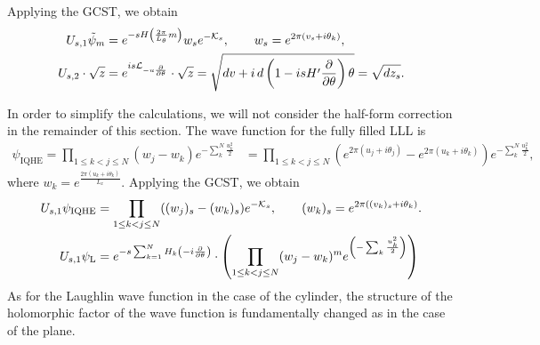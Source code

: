 \documentclass[notas.tex]{subfiles} 				%
\begin{document}
Applying the GCST, we obtain
\begin{align}\label{eq_cyl_spf_evolution}
	U_{s,1} \tilde \psi_m &= e^{-s H \left (\frac{2 \pi}{L_\theta} m \right )} w_s e^{-\mathcal{K}_s}, \qquad w_s = e^{2\pi \left (v_s + i \theta_k \right )}, \\
	U_{s,2} \cdot \sqrt{z} &= e^{i s\mathcal{L}_{-u \frac{\partial }{\partial \theta}} } \cdot \sqrt{z} = \sqrt{dv + i \, d \left( 1 - i s H' \frac{\partial }{\partial \theta} \right)\theta}= \sqrt{dz_{s}}.
\end{align}

\begin{figure}%
	\centering
	\qquad
    \label{fig:example}%
\end{figure}

\begin{figure}%
	\centering
	\qquad
    \label{fig:example}%
\end{figure}

In order to simplify the calculations, we will not consider the half-form correction in the remainder of this section. The wave function for the fully filled LLL is
\begin{align*}
	\psi_\text{IQHE} = \prod_{1 \leq k < j \leq N}(w_j-w_k) e^{-\sum_{k}^N\frac{u_k^2}{2}} &= \prod_{1 \leq k < j \leq N}\left(e^{2\pi (u_j + i \theta_j)}-e^{2\pi (u_k + i \theta_k)}\right) e^{-\sum_{k}^N\frac{u_k^2}{2}},
\end{align*}
where $w_k = e^{\frac{2\pi (u_k+i\theta_k)}{L_x}}$. Applying the GCST, we obtain
\begin{align} \label{eq_cyl_iqh_evolution}
	U_{s,1} \psi_\text{IQHE} &= \prod_{1 \leq k < j \leq N}((w_j)_s-(w_k)_s) e^{-\mathcal{K}_s}, \qquad (w_k)_s = e^{2\pi \left ((v_k)_s + i \theta_k \right )}. \\
	U_{s,1} \psi_\text{L} &= e^{- s \sum_{k=1}^{N} H_k \left (- i \frac{\partial }{\partial \theta} \right )} \cdot \left ( \prod_{1 \leq k < j \leq N}(w_j-w_k)^m e^{\left( -\sum_{k}\frac{u_k^2}{2}\right)} \right )
\end{align}
As for the Laughlin wave function in the case of the cylinder, the structure of the holomorphic factor of the wave function is fundamentally changed as in the case of the plane.
\end{document}
